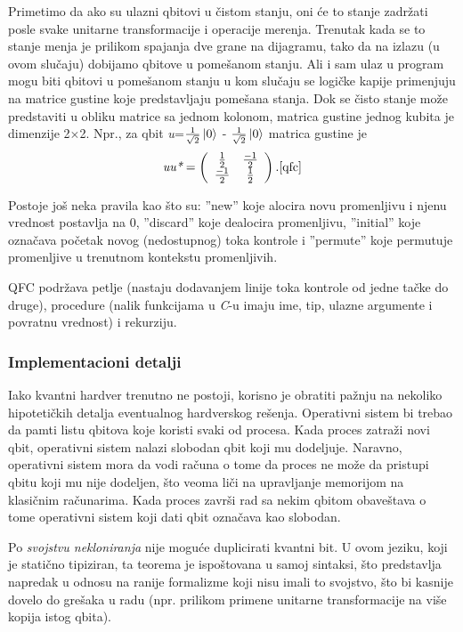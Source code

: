 \documentclass[a4paper]{article}
\begin{document}
{Primetimo da ako su ulazni qbitovi u čistom stanju, oni će to stanje zadržati posle svake unitarne transformacije i operacije merenja. Trenutak kada se to stanje menja je prilikom spajanja dve grane na dijagramu, tako da na izlazu (u ovom slučaju) dobijamo qbitove u pomešanom stanju. Ali i sam ulaz u program mogu biti qbitovi u pomešanom stanju u kom slučaju se logičke kapije primenjuju na matrice gustine koje predstavljaju pomešana stanja. Dok se čisto stanje može predstaviti u obliku matrice sa jednom kolonom, matrica gustine jednog kubita je dimenzije 2$\times$2. Npr., za qbit \textit{u}=$\frac{1}{\sqrt{2}}\ket{0}$ - $\frac{1}{\sqrt{2}}\ket{0}$ 
matrica gustine je \[\textit{uu*}= \left( \begin{array}{cc}
\frac{1}{2} & \frac{-1}{2} \\
\frac{-1}{2} & \frac{1}{2} \\
\end{array} \right).\cite[p.~11]{qfc}\]

Postoje još neka pravila kao što su: ''new'' koje alocira novu promenljivu i njenu vrednost postavlja na 0, ''discard'' koje dealocira promenljivu, ''initial'' koje označava početak novog (nedostupnog) toka kontrole i ''permute'' koje permutuje promenljive u trenutnom kontekstu promenljivih.

QFC podržava petlje (nastaju dodavanjem linije toka kontrole od jedne tačke do druge), procedure (nalik funkcijama u \emph{C}-u imaju ime, tip, ulazne argumente i povratnu vrednost) i rekurziju.

\subsubsection{Implementacioni detalji}

Iako kvantni hardver trenutno ne postoji, korisno je obratiti pažnju na nekoliko hipotetičkih detalja eventualnog hardverskog rešenja. Operativni sistem bi trebao da pamti listu qbitova koje koristi svaki od procesa. Kada proces zatraži novi qbit, operativni sistem nalazi slobodan qbit koji mu dodeljuje. Naravno, operativni sistem mora da vodi računa o tome da proces ne može da pristupi qbitu koji mu nije dodeljen, što veoma liči na upravljanje memorijom na klasičnim računarima. Kada proces završi rad sa nekim qbitom obaveštava o tome operativni sistem koji dati qbit označava kao slobodan.\cite[p. 21]{qfc}

Po \textit{svojstvu nekloniranja} nije moguće duplicirati kvantni bit. U ovom jeziku, koji je statično tipiziran, ta teorema je ispoštovana u samoj sintaksi, što predstavlja napredak u odnosu na ranije formalizme koji nisu imali to svojstvo, što bi kasnije dovelo do grešaka u radu (npr. prilikom primene unitarne transformacije na više kopija istog qbita).

}
\end{document}
